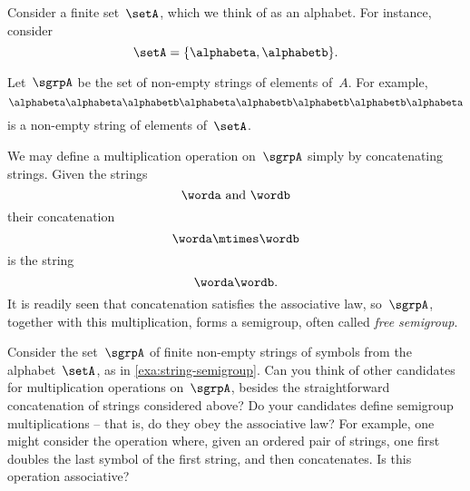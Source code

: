 \begin{example}
  \label{string-sgrp}
  \label{exa:string-semigroup}
  Consider a finite set~$\setA$, which we think of as an alphabet. For instance, consider
  \begin{equation}
    \label{eq:string-semigroup-alphabet}
    \setA = \{ \alphabeta, \alphabetb \}.
  \end{equation}

  Let~$\sgrpA$ be the set of non-empty strings of elements of~$A$. For example,
  \begin{equation}
    \label{eq:string-semigroup-word}
    \alphabeta\alphabeta \alphabetb \alphabeta \alphabetb \alphabetb \alphabetb \alphabeta
  \end{equation}
  is a non-empty string of elements of~$\setA$.

  We may define a multiplication operation on~$\sgrpA$ simply by concatenating strings. Given the strings
  \begin{equation*}
    \worda \text{ and } \wordb
  \end{equation*}
  their concatenation
  \begin{equation*}
    \label{eq:string-semigroup-wordab}
    \worda \mtimes  \wordb
  \end{equation*}
  is the string
  \begin{equation*}
    \label{eq:string-semigroup-wordab-concat}
    \worda \wordb.
  \end{equation*}
  It is readily seen that concatenation satisfies the associative law, so~$\sgrpA$, together with this multiplication, forms a semigroup, often called \emph{free semigroup}.
\end{example}
\devel{
  \begin{forslides}
    \begin{equation}
      \label{eq:string-semigroup-empty-string}
      \alphabeta\alphabeta \alphabetb \mtimes \tup{} =  \alphabeta\alphabeta \alphabetb
    \end{equation}
  \end{forslides}
}


\begin{gradedexercise}
  \label{ex:alphabet}
  Consider the set~$\sgrpA$ of finite non-empty strings of symbols from the alphabet~$\setA$, as in \cref{exa:string-semigroup}.
  Can you think of other candidates for multiplication operations on~$\sgrpA$, besides the straightforward concatenation of strings considered above?
  Do your candidates define semigroup multiplications -- that is, do they obey the associative law?
  For example, one might consider the operation where, given an ordered pair of strings, one first doubles the last symbol of the first string, and then concatenates.
  Is this operation associative?
\end{gradedexercise}



